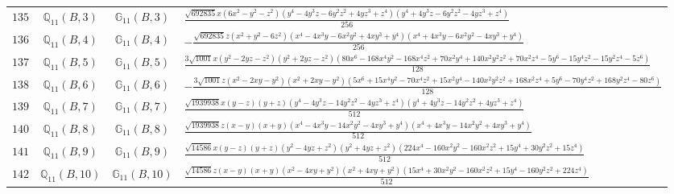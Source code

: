 \documentclass[fleqn,8pt,landscape]{jsarticle}
\begin{document}
\begin{table}[ht!]
\begin{center}
\begin{tabular}{cccl}
$ 135 $ & $ \mathbb{Q}_{11}(B,3) $ & $ \mathbb{G}_{11}(B,3) $ & $ \frac{\sqrt{692835} x \left(6 x^{2} - y^{2} - z^{2}\right) \left(y^{4} - 4 y^{3} z - 6 y^{2} z^{2} + 4 y z^{3} + z^{4}\right) \left(y^{4} + 4 y^{3} z - 6 y^{2} z^{2} - 4 y z^{3} + z^{4}\right)}{256} $ \\
$ 136 $ & $ \mathbb{Q}_{11}(B,4) $ & $ \mathbb{G}_{11}(B,4) $ & $ - \frac{\sqrt{692835} z \left(x^{2} + y^{2} - 6 z^{2}\right) \left(x^{4} - 4 x^{3} y - 6 x^{2} y^{2} + 4 x y^{3} + y^{4}\right) \left(x^{4} + 4 x^{3} y - 6 x^{2} y^{2} - 4 x y^{3} + y^{4}\right)}{256} $ \\
$ 137 $ & $ \mathbb{Q}_{11}(B,5) $ & $ \mathbb{G}_{11}(B,5) $ & $ \frac{3 \sqrt{1001} x \left(y^{2} - 2 y z - z^{2}\right) \left(y^{2} + 2 y z - z^{2}\right) \left(80 x^{6} - 168 x^{4} y^{2} - 168 x^{4} z^{2} + 70 x^{2} y^{4} + 140 x^{2} y^{2} z^{2} + 70 x^{2} z^{4} - 5 y^{6} - 15 y^{4} z^{2} - 15 y^{2} z^{4} - 5 z^{6}\right)}{128} $ \\
$ 138 $ & $ \mathbb{Q}_{11}(B,6) $ & $ \mathbb{G}_{11}(B,6) $ & $ - \frac{3 \sqrt{1001} z \left(x^{2} - 2 x y - y^{2}\right) \left(x^{2} + 2 x y - y^{2}\right) \left(5 x^{6} + 15 x^{4} y^{2} - 70 x^{4} z^{2} + 15 x^{2} y^{4} - 140 x^{2} y^{2} z^{2} + 168 x^{2} z^{4} + 5 y^{6} - 70 y^{4} z^{2} + 168 y^{2} z^{4} - 80 z^{6}\right)}{128} $ \\
$ 139 $ & $ \mathbb{Q}_{11}(B,7) $ & $ \mathbb{G}_{11}(B,7) $ & $ \frac{\sqrt{1939938} x \left(y - z\right) \left(y + z\right) \left(y^{4} - 4 y^{3} z - 14 y^{2} z^{2} - 4 y z^{3} + z^{4}\right) \left(y^{4} + 4 y^{3} z - 14 y^{2} z^{2} + 4 y z^{3} + z^{4}\right)}{512} $ \\
$ 140 $ & $ \mathbb{Q}_{11}(B,8) $ & $ \mathbb{G}_{11}(B,8) $ & $ \frac{\sqrt{1939938} z \left(x - y\right) \left(x + y\right) \left(x^{4} - 4 x^{3} y - 14 x^{2} y^{2} - 4 x y^{3} + y^{4}\right) \left(x^{4} + 4 x^{3} y - 14 x^{2} y^{2} + 4 x y^{3} + y^{4}\right)}{512} $ \\
$ 141 $ & $ \mathbb{Q}_{11}(B,9) $ & $ \mathbb{G}_{11}(B,9) $ & $ \frac{\sqrt{14586} x \left(y - z\right) \left(y + z\right) \left(y^{2} - 4 y z + z^{2}\right) \left(y^{2} + 4 y z + z^{2}\right) \left(224 x^{4} - 160 x^{2} y^{2} - 160 x^{2} z^{2} + 15 y^{4} + 30 y^{2} z^{2} + 15 z^{4}\right)}{512} $ \\
$ 142 $ & $ \mathbb{Q}_{11}(B,10) $ & $ \mathbb{G}_{11}(B,10) $ & $ \frac{\sqrt{14586} z \left(x - y\right) \left(x + y\right) \left(x^{2} - 4 x y + y^{2}\right) \left(x^{2} + 4 x y + y^{2}\right) \left(15 x^{4} + 30 x^{2} y^{2} - 160 x^{2} z^{2} + 15 y^{4} - 160 y^{2} z^{2} + 224 z^{4}\right)}{512} $ \\

\end{tabular}
\end{center}
\end{table}
\end{document}
